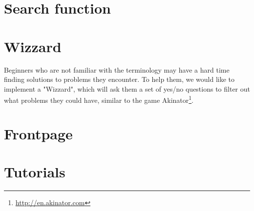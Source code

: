 \section{Search function}
\section{Wizzard}
Beginners who are not familiar with the terminology may have a hard time finding solutions to problems they encounter. To help them, we would like to implement a "Wizzard", which will ask them a set of yes/no questions to filter out what problems they could have, similar to the game Akinator\footnote{\url{http://en.akinator.com}}. 

\section{Frontpage}
\section{Tutorials}